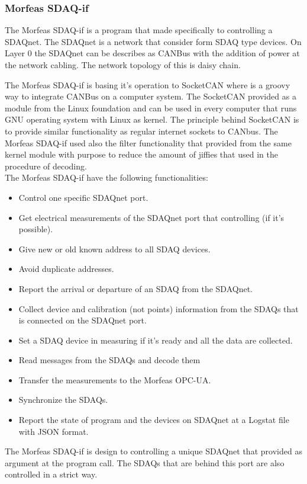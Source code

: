 \subsubsection{Morfeas SDAQ-if}
The Morfeas SDAQ-if is a program that made specifically to controlling a SDAQnet. The SDAQnet is a network that consider form SDAQ type devices.
On Layer 0 the SDAQnet can be describes as CANBus with the addition of power at the network cabling. The network topology of this is daisy chain.

The Morfeas SDAQ-if is basing it's operation to SocketCAN where is a groovy way to integrate CANBus on a computer system.
The SocketCAN provided as a module from the Linux foundation and can be used in every computer that runs GNU operating system with Linux as kernel.
The principle behind SocketCAN is to provide similar functionality as regular internet sockets to CANbus.
The Morfeas SDAQ-if used also the filter functionality that provided from the same kernel module with purpose to reduce the amount of jiffies that used in the procedure of decoding.\\
The Morfeas SDAQ-if have the following functionalities:
\begin{itemize}
	\item Control one specific SDAQnet port.
	\item Get electrical measurements of the SDAQnet port that controlling (if it's possible).
	\item Give new or old known address to all SDAQ devices.
	\item Avoid duplicate addresses.
	\item Report the arrival or departure of an SDAQ from the SDAQnet.
	\item Collect device and calibration (not points) information from the SDAQs that is connected on the SDAQnet port.
	\item Set a SDAQ device in measuring if it's ready and all the data are collected.
	\item Read messages from the SDAQs and decode them
	\item Transfer the measurements to the Morfeas OPC-UA.
	\item Synchronize the SDAQs.
	\item Report the state of program and the devices on SDAQnet at a Logstat file with JSON format.
\end{itemize}
The Morfeas SDAQ-if is design to controlling a unique SDAQnet that provided as argument at the program call. The SDAQs that are behind this port are also controlled in a strict way.\\
